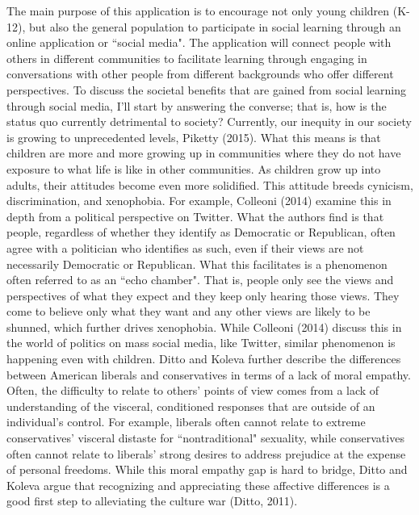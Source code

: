\documentclass[12pt, final]{article}
\begin{document}
The main purpose of this application is to encourage not only young children (K-12), but also the general population to participate in social learning through an online application or ``social media". The application will connect people with others in different communities to facilitate learning through engaging in conversations with other people from different backgrounds who offer different perspectives. To discuss the societal benefits that are gained from social learning through social media, I'll start by answering the converse; that is, how is the status quo currently detrimental to society? Currently, our inequity in our society is growing to unprecedented levels, Piketty (2015). What this means is that children are more and more growing up in communities where they do not have exposure to what life is like in other communities. As children grow up into adults, their attitudes become even more solidified. This attitude breeds cynicism, discrimination, and xenophobia. For example, Colleoni (2014) examine this in depth from a political perspective on Twitter. What the authors find is that people, regardless of whether they identify as Democratic or Republican, often agree with a politician who identifies as such, even if their views are not necessarily Democratic or Republican. What this facilitates is a phenomenon often referred to as an ``echo chamber". That is, people only see the views and perspectives of what they expect and they keep only hearing those views. They come to believe only what they want and any other views are likely to be shunned, which further drives xenophobia. While Colleoni (2014) discuss this in the world of politics on mass social media, like Twitter, similar phenomenon is happening even with children. Ditto and Koleva further describe the differences between American liberals and conservatives in terms of a lack of moral empathy. Often, the difficulty to relate to others’ points of view comes from a lack of understanding of the visceral, conditioned responses that are outside of an individual’s control.  For example, liberals often cannot relate to extreme conservatives' visceral distaste for ``nontraditional" sexuality, while conservatives often cannot relate to liberals’ strong desires to address prejudice at the expense of personal freedoms. While this moral empathy gap is hard to bridge, Ditto and Koleva argue that recognizing and appreciating these affective differences is a good first step to alleviating the culture war (Ditto, 2011). 
\\
\\
\end{document}
